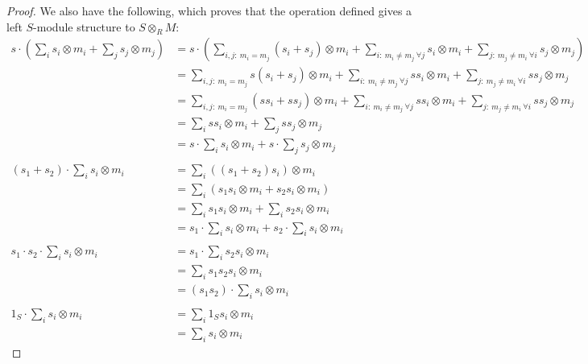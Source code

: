 \documentclass{article}
\begin{document}
\begin{proof}
	We also have the following, which proves that the operation defined gives a left $S$-module structure to $S\otimes_R M$:
	\begin{align*}
		s\cdot (\sum_i s_i\otimes m_i+\sum_j s_j\otimes m_j) &=s\cdot(\sum_{i,j:\ m_i=m_j} (s_i+s_j)\otimes m_i+\sum_{i:\ m_i\neq m_j\ \forall j} s_i\otimes m_i+\sum_{j:\ m_j\neq m_i\ \forall i} s_j\otimes m_j) \\
		&=\sum_{i,j:\ m_i=m_j} s(s_i+s_j)\otimes m_i+\sum_{i:\ m_i\neq m_j\ \forall j} ss_i\otimes m_i+\sum_{j:\ m_j\neq m_i\ \forall i} ss_j\otimes m_j \\
		&=\sum_{i,j:\ m_i=m_j} (ss_i+ss_j)\otimes m_i+\sum_{i:\ m_i\neq m_j\ \forall j} ss_i\otimes m_i+\sum_{j:\ m_j\neq m_i\ \forall i} ss_j\otimes m_j \\
		&=\sum_i ss_i\otimes m_i+\sum_j ss_j\otimes m_j \\
		&=s\cdot\sum_i s_i\otimes m_i+s\cdot\sum_j s_j\otimes m_j \\
		\\
		(s_1+s_2)\cdot \sum_i s_i\otimes m_i &=\sum_i ((s_1+s_2)s_i)\otimes m_i \\
		&=\sum_i (s_1s_i\otimes m_i+s_2s_i\otimes m_i) \\
		&=\sum_i s_1s_i\otimes m_i+\sum_i s_2s_i\otimes m_i \\
		&=s_1\cdot\sum_i s_i\otimes m_i+s_2\cdot\sum_i s_i\otimes m_i \\
		\\
		s_1\cdot s_2\cdot\sum_i s_i\otimes m_i &=s_1\cdot\sum_i s_2s_i\otimes m_i \\
		&=\sum_i s_1s_2s_i\otimes m_i \\
		&=(s_1s_2)\cdot \sum_i s_i\otimes m_i \\
		\\
		1_S\cdot\sum_i s_i\otimes m_i &=\sum_i 1_Ss_i\otimes m_i \\
		&=\sum_i s_i\otimes m_i
	\end{align*}
\end{proof}
\end{document}
